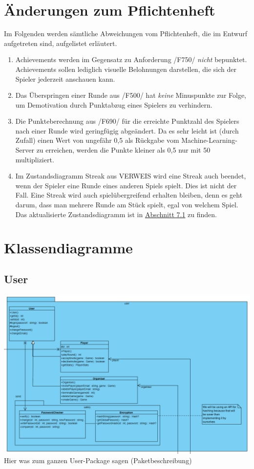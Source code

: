 \documentclass[a4paper]{scrreprt}
\begin{document}
	\chapter{Änderungen zum Pflichtenheft}
	Im Folgenden werden sämtliche Abweichungen vom Pflichtenheft, die im Entwurf aufgetreten sind, aufgelistet erläutert.
	\begin{enumerate}
		\item Achievements werden im Gegensatz zu Anforderung /F750/ \emph{nicht} bepunktet. Achievements sollen lediglich visuelle Belohnungen darstellen, die sich der Spieler jederzeit anschauen kann.
        \item Das Überspringen einer Runde aus /F500/ hat \emph{keine} Minuspunkte zur Folge, um Demotivation durch Punktabzug eines Spielers zu verhindern.
        \item Die Punkteberechnung aus /F690/ für die erreichte Punktzahl des Spielers nach einer Runde wird geringfügig abgeändert. Da es sehr leicht ist (durch Zufall) einen Wert von ungefähr 0,5 als Rückgabe vom Machine-Learning-Server zu erreichen, werden die Punkte kleiner als 0,5 nur mit 50 multipliziert.
		\item Im Zustandsdiagramm Streak aus VERWEIS wird eine Streak auch beendet, wenn der Spieler eine Runde eines anderen Spiels spielt. Dies ist nicht der Fall. Eine Streak wird auch spielübergreifend erhalten bleiben, denn es geht darum, dass man mehrere Runde am Stück spielt, egal von welchem Spiel. Das aktualisierte Zustandsdiagramm ist in \hyperlink{StreakState}{Abschnitt 7.1} zu finden.
    \end{enumerate}
	
	\chapter{Klassendiagramme}

	\section{User}
	\includegraphics[width=\textwidth]{img/user.png}
	Hier was zum ganzen User-Package sagen (Paketbeschreibung)\\
\end{document}
